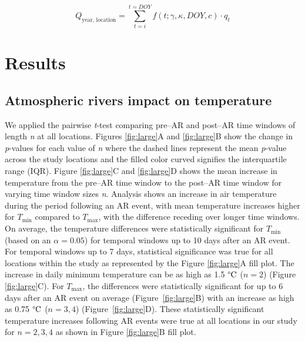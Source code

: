 \documentclass[12pts,draft]{AR_analysis_}
\begin{document}
\begin{equation}
\label{eq:final_eq}
	Q_{\text{year, location}} = \sum_{t=i}^{t=DOY} f(t; \gamma, \kappa, DOY, c) \cdot q_{t}
\end{equation}


\section{Results} 

\subsection{Atmospheric rivers impact on temperature}

We applied the pairwise \emph{t}-test comparing pre--AR and post--AR
time windows of length \emph{n} at all locations. Figures
\ref{fig:large}A and \ref{fig:large}B show the change in \emph{p}-values for each
value of \emph{n} where the dashed lines represent the mean
\emph{p}-value across
the study locations and the filled color curved signifies the interquartile range (IQR). 
Figure \ref{fig:large}C and \ref{fig:large}D shows the mean increase 
in temperature from the pre--AR time window to the post--AR time window 
for varying time window sizes \emph{n}. 
Analysis shows an increase in air temperature during the period following an
AR event, with mean temperature increases higher for $T_{\text{min}}$
compared to $T_{\text{max}}$, with the difference receding over longer
time windows. On average, the temperature differences were statistically significant
for $T_{\text{min}}$ (based on an $\alpha = 0.05$) for temporal
windows up to 10 days after an AR event. For temporal
windows up to 7 days, statistical significance
was true for all locations within the study as represented
by the Figure \ref{fig:large}A fill plot.
The increase in daily minimum temperature can be as high as 1.5 
$\mathrm{\degree C}$ ($n=2$) (Figure \ref{fig:large}C). 
For $T_{\text{max}}$, the differences were statistically significant for up
to 6 days after an AR event on average (Figure~\ref{fig:large}B) with an increase
as high as 0.75 $\mathrm{\degree C}$ ($n={3, 4}$) (Figure~\ref{fig:large}D).
These statistically significant temperature increases following AR events
were true at all locations in our study for $n={2, 3, 4}$ as shown in
Figure \ref{fig:large}B fill plot. 
\end{document}
